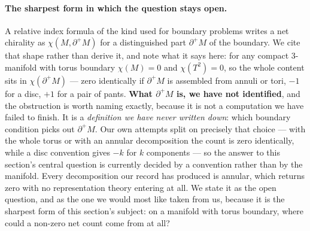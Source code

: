 \documentclass[11pt,a4paper]{article}
\theoremstyle{definition}
\theoremstyle{remark}
\begin{document}
\paragraph{The sharpest form in which the question stays open.} A relative index formula of the kind used for
boundary problems writes a net chirality as $\chi(M, \partial^+M)$ for a distinguished part $\partial^+M$ of the boundary.
We cite that shape rather than derive it, and note what it says here: for any compact $3$-manifold with torus boundary
$\chi(M) = 0$ and $\chi(T^2) = 0$, so the whole content sits in $\chi(\partial^+M)$ --- zero identically if $\partial^+M$
is assembled from annuli or tori, $-1$ for a disc, $+1$ for a pair of pants. \textbf{What $\partial^+M$ is, we have not
identified}, and the obstruction is worth naming exactly, because it is not a computation we have failed to finish. It is
a \emph{definition we have never written down}: which boundary condition picks out $\partial^+M$. Our own attempts split
on precisely that choice --- with the whole torus or with an annular decomposition the count is zero identically, while a
disc convention gives $-k$ for $k$ components --- so the answer to this section's central question is currently decided by
a convention rather than by the manifold. Every decomposition our record has produced is annular, which returns zero with
no representation theory entering at all. We state it as the open question, and as the one we would most like taken from
us, because it is the sharpest form of this section's subject: on a manifold with torus boundary, where could a non-zero
net count come from at all?
\end{document}
